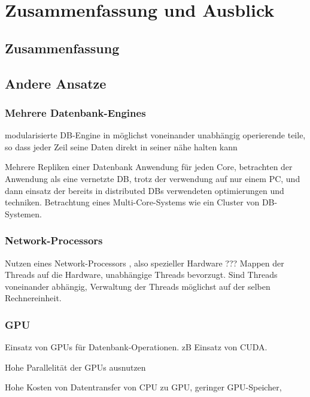 \chapter{Zusammenfassung und Ausblick}
\label{sec:Zusammenfassung-Ausblick}

\section{Zusammenfassung}
\label{sec:Zusammenfassung}

\section{Andere Ansatze}
\label{sec:AndereAnsatze}

\subsection{Mehrere Datenbank-Engines}
\label{sec:DBEngines}

modularisierte DB-Engine in möglichst voneinander unabhängig operierende teile, so dass jeder Zeil seine Daten direkt in seiner nähe halten kann

Mehrere Repliken einer Datenbank Anwendung für jeden Core, betrachten der Anwendung als eine vernetzte DB, trotz der verwendung auf nur einem PC, und dann einsatz der bereits in distributed DBs verwendeten optimierungen und techniken. Betrachtung eines Multi-Core-Systems wie ein Cluster von DB-Systemen.

\subsection{Network-Processors}
\label{sec:Network-Processors}

Nutzen eines Network-Processors \cite{GOLD}, also spezieller Hardware ??? Mappen der Threads auf die Hardware, unabhängige Threads bevorzugt. Sind Threads voneinander abhängig, Verwaltung der Threads möglichst auf der selben Rechnereinheit.

\subsection{GPU}
\label{sec:GPU}

Einsatz von GPUs für Datenbank-Operationen. zB Einsatz von CUDA.

Hohe Parallelität der GPUs ausnutzen

Hohe Kosten von Datentransfer von CPU zu GPU, geringer GPU-Speicher,
